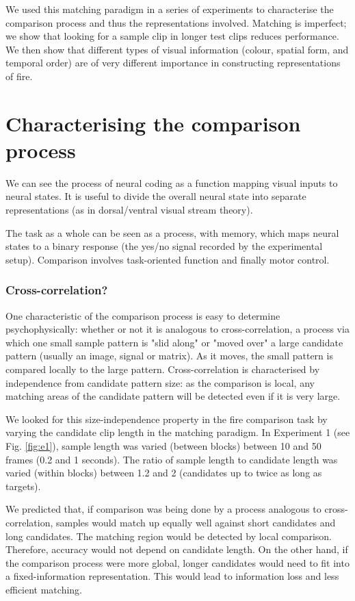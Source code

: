 \documentclass[a4paper]{article}
\begin{document}
We used this matching paradigm in a series of experiments to characterise the comparison process and thus the representations involved. Matching is imperfect; we show that looking for a sample clip in longer test clips reduces performance. We then show that different types of visual information (colour, spatial form, and temporal order) are of very different importance in constructing representations of fire.



\section{Characterising the comparison process}

We can see the process of neural coding as a function mapping visual inputs to neural states. It is useful to divide the overall neural state into separate representations (as in dorsal/ventral visual stream theory).

The task as a whole can be seen as a process, with memory, which maps neural states to a binary response (the yes/no signal recorded by the experimental setup). Comparison involves task-oriented function and finally motor control.

\subsubsection{Cross-correlation?}

One characteristic of the comparison process is easy to determine psychophysically: whether or not it is analogous to cross-correlation, a process via which one small sample pattern is "slid along" or "moved over" a large candidate pattern (usually an image, signal or matrix). As it moves, the small pattern is compared locally to the large pattern. Cross-correlation is characterised by independence from candidate pattern size: as the comparison is local, any matching areas of the candidate pattern will be detected even if it is very large.

We looked for this size-independence property in the fire comparison task by varying the candidate clip length in the matching paradigm. In Experiment 1 (see Fig. \ref{fig:e1}), sample length was varied (between blocks) between 10 and 50 frames (0.2 and 1 seconds). The ratio of sample length to candidate length was varied (within blocks) between 1.2 and 2 (candidates up to twice as long as targets).

We predicted that, if comparison was being done by a process analogous to cross-correlation, samples would match up equally well against short candidates and long candidates. The matching region would be detected by local comparison. Therefore, accuracy would not depend on candidate length. On the other hand, if the comparison process were more global, longer candidates would need to fit into a fixed-information representation. This would lead to information loss and less efficient matching.
\end{document}
